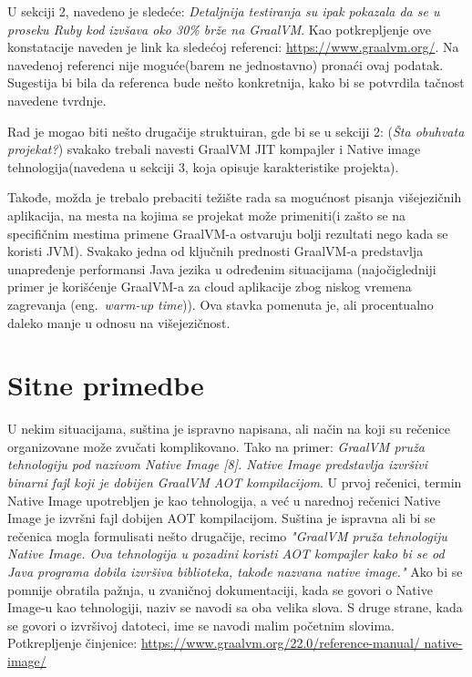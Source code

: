 \documentclass[a4paper]{report}
\begin{document}
U sekciji 2, navedeno je sledeće: \textit{Detaljnija testiranja su ipak pokazala da se u proseku Ruby kod izvšava oko 30\% brže na GraalVM}. 
Kao potkrepljenje ove konstatacije naveden je link ka sledećoj referenci: \href{https://www.graalvm.org/}{https://www.graalvm.org/}. Na 
navedenoj referenci nije moguće(barem ne jednostavno) pronaći ovaj podatak. Sugestija bi bila da referenca bude nešto konkretnija, kako bi se 
potvrdila tačnost navedene tvrdnje.

Rad je mogao biti nešto drugačije struktuiran, gde bi se u sekciji 2: (\textit{Šta obuhvata projekat?}) svakako trebali navesti GraalVM JIT 
kompajler i Native image tehnologija(navedena u sekciji 3, koja opisuje karakteristike projekta). 

Takođe, možda je trebalo prebaciti težište rada sa mogućnost pisanja višejezičnih aplikacija, na mesta na kojima se projekat može primeniti(i 
zašto se na specifičnim mestima primene GraalVM-a ostvaruju bolji rezultati nego kada se koristi JVM). Svakako jedna od ključnih prednosti 
GraalVM-a predstavlja unapređenje performansi Java jezika u određenim situacijama (najočigledniji primer je korišćenje GraalVM-a za cloud 
aplikacije zbog niskog vremena zagrevanja (eng.~{\em warm-up time})). Ova stavka pomenuta je, ali procentualno daleko manje u odnosu na 
višejezičnost.

\section{Sitne primedbe}
U nekim situacijama, suština je ispravno napisana, ali način na koji su rečenice organizovane može zvučati komplikovano. Tako na primer: 
\textit{GraalVM pruža tehnologiju pod nazivom Native Image [8]. Native Image predstavlja izvršivi binarni fajl koji je dobijen GraalVM AOT 
kompilacijom}. U prvoj rečenici, termin Native Image upotrebljen je kao tehnologija, a već u narednoj rečenici Native Image je izvršni fajl 
dobijen AOT kompilacijom. Suština je ispravna ali bi se rečenica mogla formulisati nešto drugačije, recimo \textit{"GraalVM pruža tehnologiju 
Native Image. Ova tehnologija u pozadini koristi AOT kompajler kako bi se od Java programa dobila izvršiva biblioteka, takođe nazvana native 
image."} Ako bi se pomnije obratila pažnja, u zvaničnoj dokumentaciji, kada se govori o Native Image-u kao tehnologiji, naziv se navodi sa oba 
velika slova. S druge strane, kada se govori o izvršivoj datoteci, ime se navodi malim početnim slovima. 
Potkrepljenje činjenice: \href{https://www.graalvm.org/22.0/reference-manual/native-image/}{https://www.graalvm.org/22.0/reference-manual/
native-image/}
\end{document}
